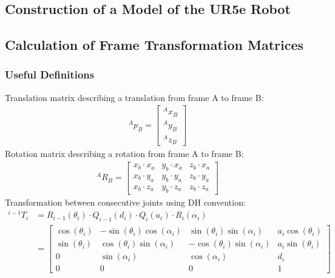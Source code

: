 \documentclass[fleqn]{article}
\begin{document}
\subsection{Construction of a Model of the UR5e Robot}

\subsection{Calculation of Frame Transformation Matrices}
\subsubsection{Useful Definitions}
Translation matrix describing a translation from frame A to frame B:
\begin{equation}
\begin{split}
^{A}p_{B}=\begin{bmatrix}
^{A}x_{B}\\
^{A}y_{B}\\
^{A}z_{B}
\end{bmatrix}
\end{split}
\end{equation}
Rotation matrix describing a rotation from frame A to frame B:
\begin{equation}
\begin{split}
^{A}R_{B}=\begin{bmatrix}
x_b\cdot x_a & y_b\cdot x_a & z_b\cdot x_a\\
x_b\cdot y_a & y_b\cdot y_a & z_b\cdot y_a\\
x_b\cdot z_a & y_b\cdot z_a & z_b\cdot z_a
\end{bmatrix}
\end{split}
\end{equation}
Transformation between consecutive joints using DH convention:
\begin{equation}
\begin{split}
^{i-1}T_{i}&=R_{i-1}(\theta_i)\cdot Q_{i-1}(d_i)\cdot Q_i(a_i)\cdot R_i(\alpha_i)\\
&=\begin{bmatrix}
\cos(\theta_i) & -\sin(\theta_i)\cos(\alpha_i) & \sin(\theta_i)\sin(\alpha_i) & a_i\cos(\theta_i)\\
\sin(\theta_i) & \cos(\theta_i)\sin(\alpha_i) & -\cos(\theta_i)\sin(\alpha_i) & a_i\sin(\theta_i)\\
0 & \sin(\alpha_i) & \cos(\alpha_i) & d_i\\
0 & 0 & 0 & 1
\end{bmatrix}
\end{split}
\end{equation}
\end{document}
